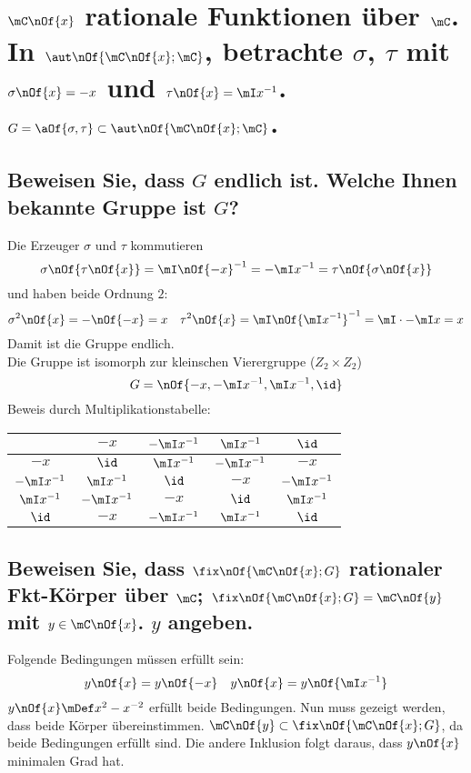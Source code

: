 \section{$\mC\nOf{x}$ rationale Funktionen über $\mC$. In $\aut\nOf{\mC\nOf{x};\mC}$, betrachte $\sigma$, $\tau$ mit $\sigma\nOf{x} = - x$ und $\tau\nOf{x} = \mI x^{-1}$. $G = \aOf{\sigma,\tau}\subset \aut\nOf{\mC\nOf{x};\mC}$.}

\subsection{Beweisen Sie, dass $G$ endlich ist. Welche Ihnen bekannte Gruppe ist $G$?}
Die Erzeuger $\sigma$ und $\tau$ kommutieren
\begin{equation}
\sigma\nOf{\tau\nOf{x}} = \mI\nOf{-x}^{-1} = -\mI x^{-1} = \tau\nOf{\sigma\nOf{x}}
\end{equation}
und haben beide Ordnung $2$:
\begin{equation}
	\sigma^2\nOf{x} = -\nOf{-x} = x \quad \tau^2\nOf{x} = \mI\nOf{\mI x^{-1}}^{-1} = \mI\cdot -\mI x = x
\end{equation}
Damit ist die Gruppe endlich.\\
Die Gruppe ist isomorph zur kleinschen Vierergruppe ($Z_2\times Z_2$)
\begin{equation}
	G = \nOf{-x,-\mI x^{-1},\mI x^{-1},\id}
\end{equation}
Beweis durch Multiplikationstabelle:
\begin{table}[H]
	\centering
	\begin{tabular}{|c| *{4}{c|}}\hline
		 & $-x$ & $-\mI x^{-1}$ & $\mI x^{-1}$ & $\id$ \\\hline
		 $-x$ & $\id$ & $\mI x^{-1}$ & $-\mI x^{-1}$ & $-x$ \\\hline
		 $-\mI x^{-1}$ & $\mI x^{-1}$ & $\id$ & $-x$ & $-\mI x^{-1}$ \\\hline
		 $\mI x^{-1}$ & $-\mI x^{-1}$ & $-x$ & $\id$ & $\mI x^{-1}$ \\\hline
		 $\id$ & $-x$ & $-\mI x^{-1}$ & $\mI x^{-1}$ & $\id$ \\\hline
	\end{tabular}
\end{table}

\subsection{Beweisen Sie, dass $\fix\nOf{\mC\nOf{x};G}$ rationaler Fkt-Körper über $\mC$; $\fix\nOf{\mC\nOf{x};G} = \mC\nOf{y}$ mit $y\in\mC\nOf{x}$. $y$ angeben.}
Folgende Bedingungen müssen erfüllt sein:
\begin{equation}
	y\nOf{x} = y\nOf{-x} \quad y\nOf{x} = y\nOf{\mI x^{-1}}
\end{equation}
$y\nOf{x} \mDef x^2-x^{-2}$ erfüllt beide Bedingungen. Nun muss gezeigt werden, dass beide Körper übereinstimmen. $\mC\nOf{y} \subset \fix\nOf{\mC\nOf{x};G}$, da beide Bedingungen erfüllt sind. Die andere Inklusion folgt daraus, dass $y\nOf{x}$ minimalen Grad hat.
